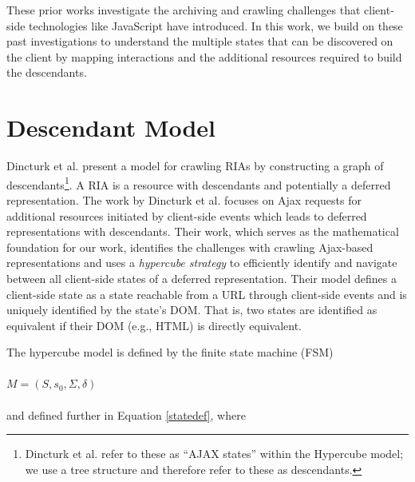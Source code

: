 \documentclass{sig-alternate}
\begin{document}
These prior works investigate the archiving and crawling challenges that client-side technologies like JavaScript have introduced. In this work, we build on these past investigations to understand the multiple states that can be discovered on the client by mapping interactions and the additional resources required to build the descendants.
\\
\section{Descendant Model}
\label{descs}
Dincturk et al. \cite{dincturkAjax} present a model for crawling RIAs by constructing a graph of descendants\footnote{Dincturk et al. refer to these as ``AJAX states'' within the Hypercube model; we use a tree structure and therefore refer to these as descendants.}. A RIA is a resource with descendants and potentially a deferred representation. The work by Dincturk et al. focuses on Ajax requests for additional resources initiated by client-side events which leads to deferred representations with descendants. Their work, which serves as the mathematical foundation for our work, identifies the challenges with crawling Ajax-based representations and uses a \emph{hypercube strategy} to efficiently identify and navigate between all client-side states of a deferred representation. Their model defines a client-side state as a state reachable from a URL through client-side events and is uniquely identified by the state's DOM. That is, two states are identified as equivalent if their DOM (e.g., HTML) is directly equivalent.

The hypercube model is defined by the finite state machine (FSM) 
\\\\
\noindent$M = (S, s_0, \Sigma, \delta)$ 
\\\\
\noindent and defined further in Equation \ref{statedef}, where
\end{document}
